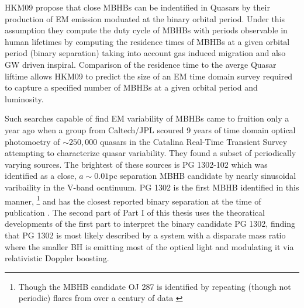 HKM09 propose that close MBHBs can be indentified in Quasars by their production of EM emission moduated at the binary orbital period. Under this assumption they compute the duty cycle of MBHBs with periods observable in human lifetimes by computing the residence times of MBHBs at a given orbital period (binary separation) taking into account gas induced migration and also GW driven inspiral. Comparison of the residence time to the averge Quasar liftime allows HKM09 to predict the size of an EM time domain survey required to capture a specified number of MBHBs at a given orbital period and luminosity.






Such searches capable of find EM variability of MBHBs came to fruition only a
year ago when a group from Caltech/JPL scoured 9 years of time domain optical
photomoetry of $\sim250,000$ quasars in the Catalina Real-Time Transient
Survey \citep[CRTS][]{CRTS1:Drake:2009, CRTS2:Djorgovski:2010,
CRTS3:2011Mahabal, CRTS4:Djorgovski:2011} attempting to characterize quasar
variability. They found a subset of periodically varying sources. The
brightest of these sources is PG 1302-102 which was identified as a close, $a
\sim 0.01$pc separation MBHB candidate by nearly sinusoidal varibaility in the
V-band ocntinuum. PG 1302 is the first MBHB identified in this manner,
\footnote{Though the MBHB candidate OJ 287 is identified by repeating (though
not periodic) flares from over a century of data \citep{LehtoValtonen:1996,
Pursimo:2000}} and has the closest reported binary separation at the time of
publication \citep{Graham+2015a}. The second part of Part I of this thesis
uses the theoratical developments of the first part to interpret the binary
candidate PG 1302, finding that PG 1302 is most likely described by a system
with a disparate mass ratio where the smaller BH is emitting most of the
optical light and modulating it via relativistic Doppler boosting.


